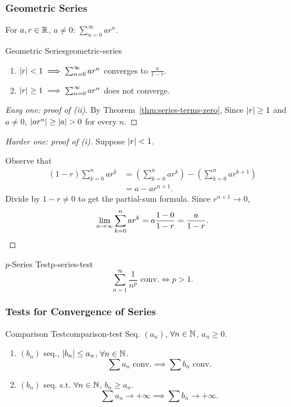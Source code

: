 \subsubsection{Geometric Series}

For $a,r\in\mathbb{R}$, $a\ne0$: $\sum_{n=0}^{\infty}ar^n$.

\begin{theorem}{Geometric Series}{geometric-series}
  \begin{enumerate}[label=(\roman*)]
    \item $\left\lvert r \right\rvert<1\implies\sum_{n=0}^{\infty}ar^n$ converges to $\frac{a}{1-r}$.
    \item $\left\lvert r \right\rvert\ge1\implies\sum_{n=0}^{\infty}ar^n$ does not converge.
  \end{enumerate}
\end{theorem}

\begin{proof}[Easy one: proof of (ii)]\proofheadingbreak
  By Theorem~\ref{thm:series-terms-zero},
  Since $\left\lvert r \right\rvert\ge1$ and $a\ne0$, $\left\lvert ar^n \right\rvert\ge\left\lvert a \right\rvert>0$ for every $n$.
\end{proof}

\begin{proof}[Harder one: proof of (i)]
  Suppose $\left\lvert r \right\rvert<1$.

  Observe that
  \[
    \begin{aligned}
      (1-r)\sum_{k=0}^{n}ar^k
       & =\left(\sum_{k=0}^{n}ar^k\right)
      -\left(\sum_{k=0}^{n}ar^{k+1}\right) \\
       & =a-ar^{n+1}.
    \end{aligned}
  \]
  Divide by $1-r\ne0$ to get the partial-sum formula. Since $r^{n+1}\to0$,
  \[
    \lim_{n\to\infty}\sum_{k=0}^n ar^k=a\frac{1-0}{1-r}=\frac{a}{1-r}.\qedhere
  \]
\end{proof}

\begin{theorem}{$p$-Series Test}{p-series-test}
  \[
    \sum_{n=1}^{\infty}\frac{1}{n^p}\text{ conv.}\iff p>1.
  \]
\end{theorem}

\subsubsection{Tests for Convergence of Series}

\begin{theorem}{Comparison Test}{comparison-test}
  Seq. $(a_n)$, $\forall n\in\mathbb{N}$, $a_n\ge0$.
  \begin{enumerate}[label=(\roman*)]
    \item $(b_n)$ seq., $\left\lvert b_n \right\rvert\le a_n$, $\forall n\in\mathbb{N}$.
          \[
            \sum a_n\text{ conv.}\implies\sum b_n\text{ conv.}
          \]
    \item $(b_n)$ seq. s.t. $\forall n\in\mathbb{N}$, $b_n\ge a_n$.
          \[
            \sum a_n\to+\infty\implies\sum b_n\to+\infty.
          \]
  \end{enumerate}
\end{theorem}

